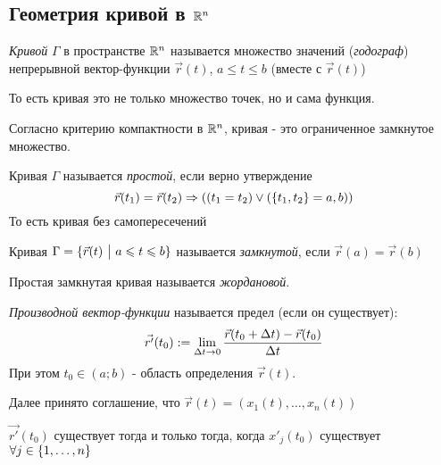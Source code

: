 \subsection{Геометрия кривой в $\mathbb{R}^n$}

\begin{definition}
	\textit{Кривой} $\Gamma$ в пространстве $\mathbb{R}^n$ называется множество значений (\textit{годограф}) непрерывной вектор-функции $\vec{r}(t)$, $a \le t \le b$ (вместе с $\vec{r}(t)$)
\end{definition}

\begin{note}
	То есть кривая это не только множество точек, но и сама функция.
\end{note}

\begin{corollary}
	Согласно критерию компактности в $\mathbb{R}^n$, кривая - это ограниченное замкнутое множество.
\end{corollary}

\begin{definition}
	Кривая $\Gamma$ называется \textit{простой}, если верно утверждение
	\[
		\vec{r}(t_1) = \vec{r}(t_2) \Rightarrow \left((t_1 = t_2) \vee (\{t_1, t_2\} = a, b)\right)
	\]
	То есть кривая без самопересечений
\end{definition}

\begin{definition}
	Кривая $\Gamma = \{\vec{r}(t) \ \big|\  a \leqslant t \leqslant b\}$ называется \textit{замкнутой}, если $\vec{r}(a) = \vec{r}(b)$
\end{definition}

\begin{definition}
	Простая замкнутая кривая называется \textit{жордановой}.
\end{definition}

\begin{definition}
	\textit{Производной вектор-функции} называется предел (если он существует):
	\[
		\vec{r'}(t_0) := \lim\limits_{\Delta t \to 0} \frac{\vec{r}(t_0 + \Delta t) - \vec{r}(t_0)}{\Delta t}
	\]
	При этом $t_0 \in (a; b)$ - область определения $\vec{r}(t)$.
\end{definition}

\begin{note}
	Далее принято соглашение, что $\vec{r}(t) = (x_1(t), \ldots, x_n(t))$
\end{note}

\begin{lemma}
	$\vec{r'}(t_0)$ существует тогда и только тогда, когда $x'_j(t_0)$ существует $\forall j \in \{1, \ldots, n\}$
\end{lemma}

